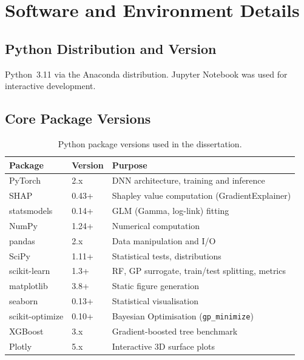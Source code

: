 \section{Software and Environment Details}
\label{annexure:software}


\subsection{Python Distribution and Version}
\label{annexure:python}

Python~3.11 via the Anaconda distribution. Jupyter Notebook was used for interactive development.

\subsection{Core Package Versions}
\label{annexure:packages}

\begin{table}[htbp]
\centering
\begin{tabular}{lll}
\toprule
\textbf{Package} & \textbf{Version} & \textbf{Purpose} \\
\midrule
PyTorch           & 2.x              & DNN architecture, training and inference \\
SHAP              & 0.43+            & Shapley value computation (GradientExplainer) \\
statsmodels       & 0.14+            & GLM (Gamma, log-link) fitting \\
NumPy             & 1.24+            & Numerical computation \\
pandas            & 2.x              & Data manipulation and I/O \\
SciPy             & 1.11+            & Statistical tests, distributions \\
scikit-learn      & 1.3+             & RF, GP surrogate, train/test splitting, metrics \\
matplotlib        & 3.8+             & Static figure generation \\
seaborn           & 0.13+            & Statistical visualisation \\
scikit-optimize   & 0.10+            & Bayesian Optimisation (\texttt{gp\_minimize}) \\
XGBoost           & 3.x              & Gradient-boosted tree benchmark \\
Plotly            & 5.x              & Interactive 3D surface plots \\
\bottomrule
\end{tabular}
\caption{Python package versions used in the dissertation.}
\label{tab:packages}
\end{table}

